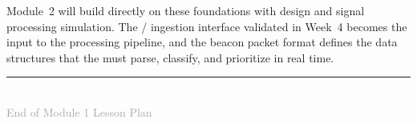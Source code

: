 \documentclass[11pt,letterpaper]{article}
\begin{document}
	Module~2 will build directly on these foundations with \FPGA{} \RTL{} design and signal processing simulation. The \UART{}/\SPI{} ingestion interface validated in Week~4 becomes the input to the \FPGA{} processing pipeline, and the beacon packet format defines the data structures that the \RTL{} must parse, classify, and prioritize in real time.
	
	\vfill
	\clearpage
	\printglossary[type=\acronymtype,title={Acronyms Used}]

	\begin{center}
		\rule{0.5\textwidth}{0.4pt}\\[6pt]
		{\small\textcolor{darkgray}{End of Module 1 Lesson Plan}}
	\end{center}
	
\end{document}
